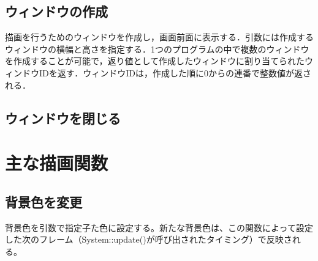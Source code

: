 \documentclass[a4paper, 11pt, oneside, onecolumn, openany]{jsarticle}
\begin{document}
\subsection{ウィンドウの作成}
描画を行うためのウィンドウを作成し，画面前面に表示する．引数には作成するウィンドウの横幅と高さを指定する．1つのプログラムの中で複数のウィンドウを作成することが可能で，返り値として作成したウィンドウに割り当てられたウィンドウIDを返す．ウィンドウIDは，作成した順に0からの連番で整数値が返される．

\subsection{ウィンドウを閉じる}


\section{主な描画関数}
\subsection{背景色を変更}
背景色を引数で指定子た色に設定する。新たな背景色は、この関数によって設定した次のフレーム（System::update()が呼び出されたタイミング）で反映される。
\end{document}
